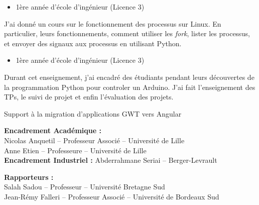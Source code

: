 \documentclass[10pt,a4paper,ragged2e,withhyper]{altacv}
\begin{document}
\divider


\begin{itemize}
\item 1ère année d'école d'ingénieur (Licence 3)
\end{itemize}

J'ai donné un cours sur le fonctionnement des processus sur Linux.
En particulier, leurs fonctionnements, comment utiliser les \textit{fork}, lister les processus, et envoyer des signaux aux processus en utilisant Python.

\divider


\begin{itemize}
  \item 1ère année d'école d'ingénieur (Licence 3)
\end{itemize}

Durant cet enseignement, j'ai encadré des étudiants pendant leurs découvertes de la programmation Python pour controler un Arduino.
J'ai fait l'enseignement des TPs, le suivi de projet et enfin l'évaluation des projets.

\medskip


Support à la migration d'applications GWT vers Angular

\textbf{Encadrement Académique :}\\
Nicolas Anquetil -- Professeur Associé -- Université de Lille\\
Anne Etien -- Professeure -- Université de Lille\\
\textbf{Encadrement Industriel :} Abderrahmane Seriai -- Berger-Levrault


\textbf{Rapporteurs :}\\
Salah Sadou -- Professeur -- Université Bretagne Sud\\
Jean-Rémy Falleri -- Professeur Associé -- Université de Bordeaux Sud\\
\end{document}

